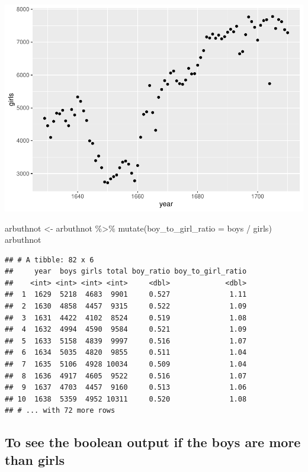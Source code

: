 \documentclass[
]{article}
\newenvironment{Shaded}{\begin{snugshade}}{\end{snugshade}}
\newcommand{\AttributeTok}[1]{\textcolor[rgb]{0.77,0.63,0.00}{#1}}
\newcommand{\FunctionTok}[1]{\textcolor[rgb]{0.00,0.00,0.00}{#1}}
\newcommand{\NormalTok}[1]{#1}
\newcommand{\OtherTok}[1]{\textcolor[rgb]{0.56,0.35,0.01}{#1}}
\newcommand{\SpecialCharTok}[1]{\textcolor[rgb]{0.00,0.00,0.00}{#1}}
\begin{document}
\includegraphics{week1_practice_files/figure-latex/unnamed-chunk-15-1.pdf}

\begin{Shaded}
\begin{Highlighting}[]
\NormalTok{arbuthnot }\OtherTok{\textless{}{-}}\NormalTok{ arbuthnot }\SpecialCharTok{\%\textgreater{}\%}
  \FunctionTok{mutate}\NormalTok{(}\AttributeTok{boy\_to\_girl\_ratio =}\NormalTok{ boys }\SpecialCharTok{/}\NormalTok{ girls)}
\NormalTok{arbuthnot}
\end{Highlighting}
\end{Shaded}

\begin{verbatim}
## # A tibble: 82 x 6
##     year  boys girls total boy_ratio boy_to_girl_ratio
##    <int> <int> <int> <int>     <dbl>             <dbl>
##  1  1629  5218  4683  9901     0.527              1.11
##  2  1630  4858  4457  9315     0.522              1.09
##  3  1631  4422  4102  8524     0.519              1.08
##  4  1632  4994  4590  9584     0.521              1.09
##  5  1633  5158  4839  9997     0.516              1.07
##  6  1634  5035  4820  9855     0.511              1.04
##  7  1635  5106  4928 10034     0.509              1.04
##  8  1636  4917  4605  9522     0.516              1.07
##  9  1637  4703  4457  9160     0.513              1.06
## 10  1638  5359  4952 10311     0.520              1.08
## # ... with 72 more rows
\end{verbatim}

\hypertarget{to-see-the-boolean-output-if-the-boys-are-more-than-girls}{%
\subsection{To see the boolean output if the boys are more than
girls}\label{to-see-the-boolean-output-if-the-boys-are-more-than-girls}}
\end{document}
